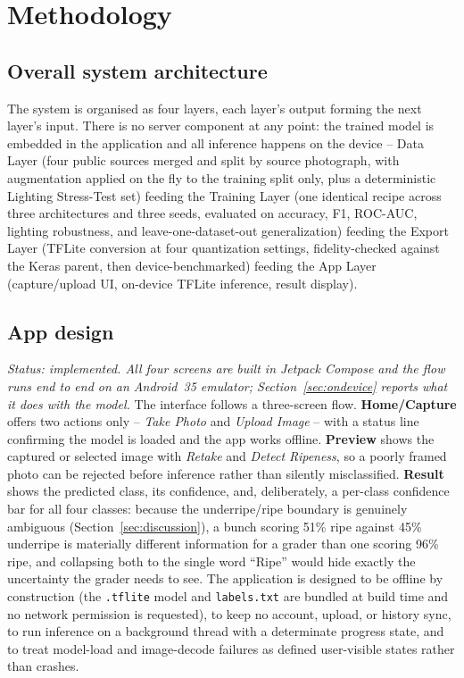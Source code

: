 \documentclass{article}
\begin{document}
\section{Methodology}
\label{sec:methodology}

\subsection{Overall system architecture}

The system is organised as four layers, each layer's output forming the next layer's input. There is no
server component at any point: the trained model is embedded in the application and all inference happens
on the device -- Data Layer (four public sources merged and split by source photograph, with augmentation
applied on the fly to the training split only, plus a deterministic Lighting Stress-Test set) feeding the
Training Layer (one identical recipe across three architectures and three seeds, evaluated on accuracy,
F1, ROC-AUC, lighting robustness, and leave-one-dataset-out generalization) feeding the Export Layer
(TFLite conversion at four quantization settings, fidelity-checked against the Keras parent, then
device-benchmarked) feeding the App Layer (capture/upload UI, on-device TFLite inference, result display).

\subsection{App design}
\label{sec:appdesign}

\textit{Status: implemented. All four screens are built in Jetpack Compose and the flow runs end to end on
an Android~35 emulator; Section~\ref{sec:ondevice} reports what it does with the model.}
The interface follows a three-screen flow. \textbf{Home/Capture} offers two actions only -- \textit{Take
Photo} and \textit{Upload Image} -- with a status line confirming the model is loaded and the app works
offline. \textbf{Preview} shows the captured or selected image with \textit{Retake} and \textit{Detect
Ripeness}, so a poorly framed photo can be rejected before inference rather than silently misclassified.
\textbf{Result} shows the predicted class, its confidence, and, deliberately, a per-class confidence bar
for all four classes: because the underripe/ripe boundary is genuinely ambiguous
(Section~\ref{sec:discussion}), a bunch scoring 51\% ripe against 45\% underripe is materially different
information for a grader than one scoring 96\% ripe, and collapsing both to the single word ``Ripe'' would
hide exactly the uncertainty the grader needs to see. The application is designed to be offline by
construction (the \texttt{.tflite} model and \texttt{labels.txt} are bundled at build time and no network
permission is requested), to keep no account, upload, or history sync, to run inference on a background
thread with a determinate progress state, and to treat model-load and image-decode failures as defined
user-visible states rather than crashes.
\end{document}
